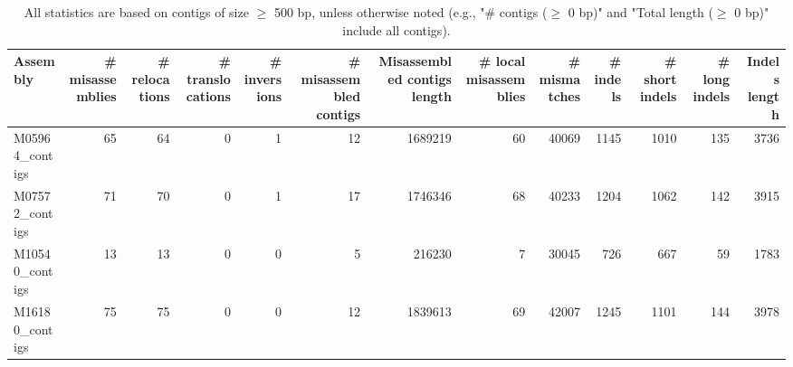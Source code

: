 \documentclass[12pt,a4paper]{article}
\begin{document}
\begin{table}[ht]
\begin{center}
\caption{All statistics are based on contigs of size $\geq$ 500 bp, unless otherwise noted (e.g., "\# contigs ($\geq$ 0 bp)" and "Total length ($\geq$ 0 bp)" include all contigs).}
\begin{tabular}{|l*{12}{|r}|}
\hline
Assembly & \# misassemblies &     \# relocations &     \# translocations &     \# inversions & \# misassembled contigs & Misassembled contigs length & \# local misassemblies & \# mismatches & \# indels &     \# short indels &     \# long indels & Indels length \\ \hline
M05964\_contigs & 65 & 64 & 0 & 1 & 12 & 1689219 & 60 & 40069 & 1145 & 1010 & 135 & 3736 \\ \hline
M07572\_contigs & 71 & 70 & 0 & 1 & 17 & 1746346 & 68 & 40233 & 1204 & 1062 & 142 & 3915 \\ \hline
M10540\_contigs & 13 & 13 & 0 & 0 & 5 & 216230 & 7 & 30045 & 726 & 667 & 59 & 1783 \\ \hline
M16180\_contigs & 75 & 75 & 0 & 0 & 12 & 1839613 & 69 & 42007 & 1245 & 1101 & 144 & 3978 \\ \hline
\end{tabular}
\end{center}
\end{table}
\end{document}
